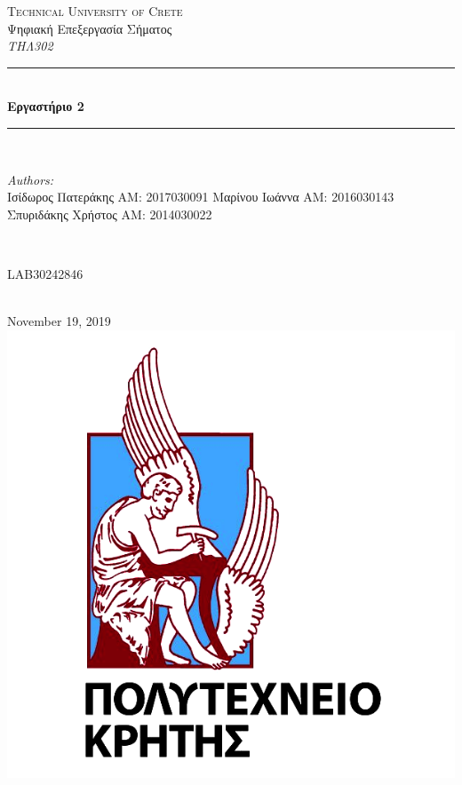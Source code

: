 \documentclass[11pt]{article}
\begin{document}
\begin{titlepage}
    \center
    \textsc{\LARGE Technical University of Crete}\\[2cm] 
    \Large Ψηφιακή Επεξεργασία Σήματος\\
    \emph{ΤΗΛ302}\\[1cm] 
    
    \rule{\linewidth}{0.5mm} \\[0.5cm]
        { \huge \bfseries Εργαστήριο 2}\\[0.5cm]
    \rule{\linewidth}{0.5mm} \\[2.5cm]
    
    \begin{minipage}{0.4\textwidth}
        \begin{flushleft} \large
            \emph{Authors:}\\
                Ισίδωρος Πατεράκης AM: 2017030091
                Μαρίνου Ιωάννα AM: 2016030143
                Σπυριδάκης Χρήστος AM: 2014030022
        \end{flushleft}
    \end{minipage}
    ~
    \begin{minipage}{0.4\textwidth}
        \begin{flushright} \large
            LAB30242846 \\
        \end{flushright}
    \end{minipage}\\[2cm]
    
    {\large November 19, 2019}\\[2cm] 
    \includegraphics[scale=0.5]{TUC.png} 
    \vfill
\end{titlepage}
\end{document}
